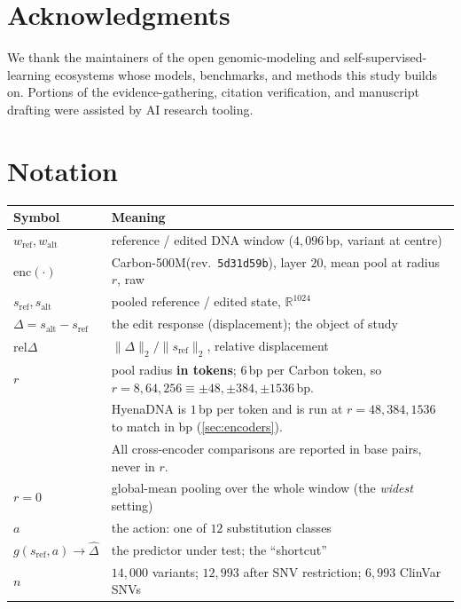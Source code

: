 \documentclass{article}
\newcommand{\Real}{\mathbb{R}}
\newcommand{\enc}{\mathrm{enc}}
\newcommand{\sref}{s_{\mathrm{ref}}}
\newcommand{\salt}{s_{\mathrm{alt}}}
\newcommand{\D}{\Delta}
\newcommand{\Dhat}{\hat\Delta}
\newcommand{\gpred}{g}
\newcommand{\wref}{w_{\mathrm{ref}}}
\newcommand{\walt}{w_{\mathrm{alt}}}
\newcommand{\carbon}{Carbon-500M\xspace}
\begin{document}
\section*{Acknowledgments}
We thank the maintainers of the open genomic-modeling and self-supervised-learning ecosystems whose
models, benchmarks, and methods this study builds on. Portions of the evidence-gathering, citation
verification, and manuscript drafting were assisted by AI research tooling.

{\small


}

\appendix
\section{Notation}
\label{app:notation}
\begin{center}\small
\begin{tabular}{ll}
\toprule
Symbol & Meaning \\
\midrule
$\wref,\walt$ & reference / edited DNA window ($4{,}096$\,bp, variant at centre) \\
$\enc(\cdot)$ & \carbon (rev.\ \texttt{5d31d59b}), layer $20$, mean pool at radius $r$, raw \\
$\sref,\salt$ & pooled reference / edited state, $\Real^{1024}$ \\
$\D=\salt-\sref$ & the edit response (displacement); the object of study \\
$\mathrm{rel}\D$ & $\lVert\D\rVert_2/\lVert\sref\rVert_2$, relative displacement \\
$r$ & pool radius \textbf{in tokens}; $6$\,bp per Carbon token, so $r{=}8,64,256 \equiv
\pm48,\pm384,\pm1536$\,bp. \\
& HyenaDNA is $1$\,bp per token and is run at $r{=}48,384,1536$ to match in bp
(\cref{sec:encoders}). \\
& All cross-encoder comparisons are reported in base pairs, never in $r$. \\
$r{=}0$ & global-mean pooling over the whole window (the \emph{widest} setting) \\
$a$ & the action: one of $12$ substitution classes \\
$\gpred(\sref,a)\to\Dhat$ & the predictor under test; the ``shortcut'' \\
$n$ & $14{,}000$ variants; $12{,}993$ after SNV restriction; $6{,}993$ ClinVar SNVs \\
\bottomrule
\end{tabular}
\end{center}
\end{document}
